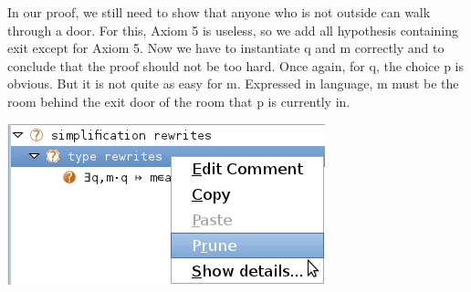 In our proof, we still need to show that anyone who is not outside can walk through a door. For this, Axiom 5 is useless, so we add all hypothesis containing exit except for Axiom 5. Now we have to instantiate q and m correctly and to conclude that the proof should not be too hard. Once again, for q, the choice p is obvious. But it is not quite as easy for m. Expressed in language, m must be the room behind the exit door of the room that p is currently in. 

\begin{center}
	\includegraphics[]{img/tutorial/tut_10_prune.png}
\end{center}

